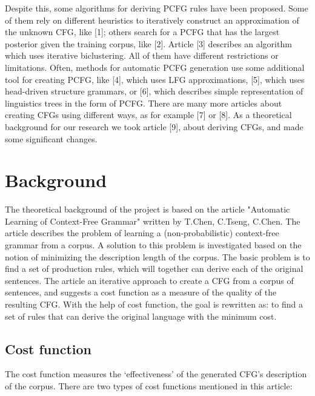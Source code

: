 \documentclass[paper=a4, fontsize=11pt]{scrartcl} %
\numberwithin{equation}{section} %
\numberwithin{figure}{section} %
\numberwithin{table}{section} %
\begin{document}
Despite this, some algorithms for deriving PCFG rules have been proposed. Some of them rely on different heuristics to iteratively construct an approximation of the unknown CFG, like [1]; others search for a PCFG that has the largest posterior given the training corpus, like [2]. Article [3] describes an algorithm which uses iterative biclustering. All of them have different restrictions or limitations. Often, methods for automatic PCFG generation use some additional tool for creating PCFG, like [4], which uses LFG approximations, [5], which uses head-driven structure grammars, or [6], which describes simple representation of linguistics trees in the form of PCFG. There are many more articles about creating CFGs using different ways, as for example [7] or [8]. As a theoretical background for our research we took article [9], about deriving CFGs, and made some significant changes.



\section{Background}

The theoretical background of the project is based on the article "Automatic Learning of Context-Free Grammar" written by T.Chen, C.Tseng, C.Chen. The article describes the problem of learning a (non-probabilistic) context-free grammar from a corpus. A solution to this problem is investigated based on the notion of minimizing the description length of the corpus. 
The basic problem is to find a set of production rules, which will together can derive each of the original sentences. The article an iterative approach to create a CFG from a corpus of sentences, and suggests a cost function as a measure of the quality of the resulting CFG. With the help of cost function, the goal is rewritten as: to find a set of rules that can derive the original language with the minimum cost.

\subsection{Cost function}

The cost function measures the `effectiveness' of the generated CFG's description of the corpus. There are two types of cost functions mentioned in this article:
\end{document}
